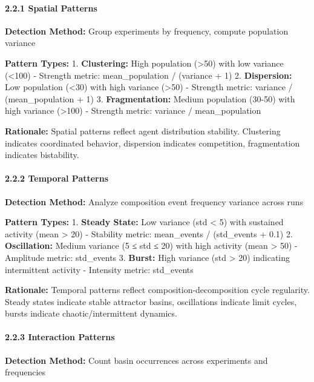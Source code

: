 \documentclass[
]{article}
\begin{document}
\paragraph{2.2.1 Spatial Patterns}\label{spatial-patterns}

\textbf{Detection Method:} Group experiments by frequency, compute
population variance

\textbf{Pattern Types:} 1. \textbf{Clustering:} High population
(\textgreater50) with low variance (\textless100) - Strength metric:
mean\_population / (variance + 1) 2. \textbf{Dispersion:} Low population
(\textless30) with high variance (\textgreater50) - Strength metric:
variance / (mean\_population + 1) 3. \textbf{Fragmentation:} Medium
population (30-50) with high variance (\textgreater100) - Strength
metric: variance / mean\_population

\textbf{Rationale:} Spatial patterns reflect agent distribution
stability. Clustering indicates coordinated behavior, dispersion
indicates competition, fragmentation indicates bistability.

\paragraph{2.2.2 Temporal Patterns}\label{temporal-patterns}

\textbf{Detection Method:} Analyze composition event frequency variance
across runs

\textbf{Pattern Types:} 1. \textbf{Steady State:} Low variance (std
\textless{} 5) with sustained activity (mean \textgreater{} 20) -
Stability metric: mean\_events / (std\_events + 0.1) 2.
\textbf{Oscillation:} Medium variance (5 ≤ std ≤ 20) with high activity
(mean \textgreater{} 50) - Amplitude metric: std\_events 3.
\textbf{Burst:} High variance (std \textgreater{} 20) indicating
intermittent activity - Intensity metric: std\_events

\textbf{Rationale:} Temporal patterns reflect composition-decomposition
cycle regularity. Steady states indicate stable attractor basins,
oscillations indicate limit cycles, bursts indicate chaotic/intermittent
dynamics.

\paragraph{2.2.3 Interaction Patterns}\label{interaction-patterns}

\textbf{Detection Method:} Count basin occurrences across experiments
and frequencies
\end{document}
